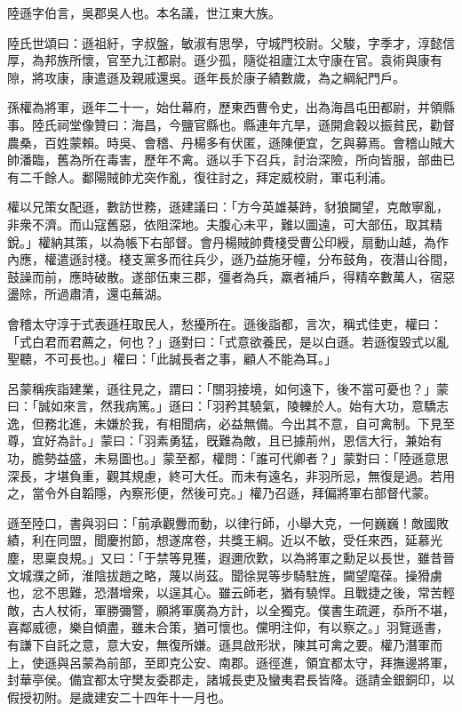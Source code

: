 
\begin{pinyinscope}
陸遜字伯言，吳郡吳人也。本名議，世江東大族。

陸氏世頌曰：遜祖紆，字叔盤，敏淑有思學，守城門校尉。父駿，字季才，淳懿信厚，為邦族所懷，官至九江都尉。遜少孤，隨從祖廬江太守康在官。袁術與康有隙，將攻康，康遣遜及親戚還吳。遜年長於康子績數歲，為之綱紀門戶。

孫權為將軍，遜年二十一，始仕幕府，歷東西曹令史，出為海昌屯田都尉，并領縣事。陸氏祠堂像贊曰：海昌，今鹽官縣也。縣連年亢旱，遜開倉穀以振貧民，勸督農桑，百姓蒙賴。時吳、會稽、丹楊多有伏匿，遜陳便宜，乞與募焉。會稽山賊大帥潘臨，舊為所在毒害，歷年不禽。遜以手下召兵，討治深險，所向皆服，部曲已有二千餘人。鄱陽賊帥尤突作亂，復往討之，拜定威校尉，軍屯利浦。

權以兄策女配遜，數訪世務，遜建議曰：「方今英雄棊跱，豺狼闚望，克敵寧亂，非衆不濟。而山寇舊惡，依阻深地。夫腹心未平，難以圖遠，可大部伍，取其精銳。」權納其策，以為帳下右部督。會丹楊賊帥費棧受曹公印綬，扇動山越，為作內應，權遣遜討棧。棧支黨多而往兵少，遜乃益施牙幢，分布鼓角，夜潛山谷間，鼓譟而前，應時破散。遂部伍東三郡，彊者為兵，羸者補戶，得精卒數萬人，宿惡盪除，所過肅清，還屯蕪湖。

會稽太守淳于式表遜枉取民人，愁擾所在。遜後詣都，言次，稱式佳吏，權曰：「式白君而君薦之，何也？」遜對曰：「式意欲養民，是以白遜。若遜復毀式以亂聖聽，不可長也。」權曰：「此誠長者之事，顧人不能為耳。」

呂蒙稱疾詣建業，遜往見之，謂曰：「關羽接境，如何遠下，後不當可憂也？」蒙曰：「誠如來言，然我病篤。」遜曰：「羽矜其驍氣，陵轢於人。始有大功，意驕志逸，但務北進，未嫌於我，有相聞病，必益無備。今出其不意，自可禽制。下見至尊，宜好為計。」蒙曰：「羽素勇猛，旣難為敵，且已據荊州，恩信大行，兼始有功，膽勢益盛，未易圖也。」蒙至都，權問：「誰可代卿者？」蒙對曰：「陸遜意思深長，才堪負重，觀其規慮，終可大任。而未有遠名，非羽所忌，無復是過。若用之，當令外自韜隱，內察形便，然後可克。」權乃召遜，拜偏將軍右部督代蒙。

遜至陸口，書與羽曰：「前承觀釁而動，以律行師，小舉大克，一何巍巍！敵國敗績，利在同盟，聞慶拊節，想遂席卷，共獎王綱。近以不敏，受任來西，延慕光塵，思稟良規。」又曰：「于禁等見獲，遐邇欣歎，以為將軍之勳足以長世，雖昔晉文城濮之師，淮陰拔趙之略，蔑以尚茲。聞徐晃等步騎駐旌，闚望麾葆。操猾虜也，忿不思難，恐潛增衆，以逞其心。雖云師老，猶有驍悍。且戰捷之後，常苦輕敵，古人杖術，軍勝彌警，願將軍廣為方計，以全獨克。僕書生疏遲，忝所不堪，喜鄰威德，樂自傾盡，雖未合策，猶可懷也。儻明注仰，有以察之。」羽覽遜書，有謙下自託之意，意大安，無復所嫌。遜具啟形狀，陳其可禽之要。權乃潛軍而上，使遜與呂蒙為前部，至即克公安、南郡。遜徑進，領宜都太守，拜撫邊將軍，封華亭侯。備宜都太守樊友委郡走，諸城長吏及蠻夷君長皆降。遜請金銀銅印，以假授初附。是歲建安二十四年十一月也。


\end{pinyinscope}

